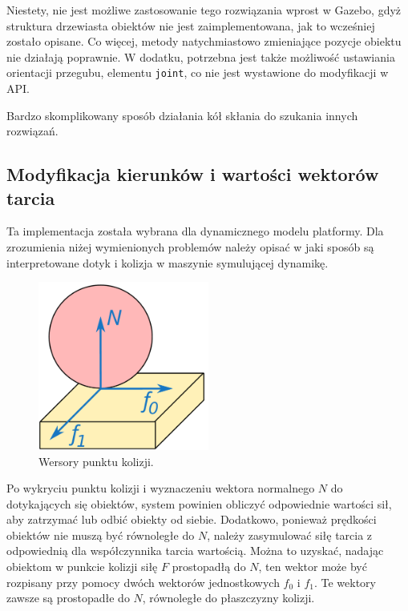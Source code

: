 		Niestety, nie jest możliwe zastosowanie tego rozwiązania wprost w Gazebo, gdyż struktura drzewiasta obiektów nie jest zaimplementowana, jak to wcześniej zostało opisane.
		Co więcej, metody natychmiastowo zmieniające pozycje obiektu nie działają poprawnie.
		W dodatku, potrzebna jest także możliwość ustawiania orientacji przegubu, elementu \texttt{joint}, co nie jest wystawione do modyfikacji w API.

		Bardzo skomplikowany sposób działania kół skłania do szukania innych rozwiązań.

	\subsection{Modyfikacja kierunków i wartości wektorów tarcia}
		\label{sec:friction}
		Ta implementacja została wybrana dla dynamicznego modelu platformy.
		Dla zrozumienia niżej wymienionych problemów należy opisać w jaki sposób są interpretowane dotyk i kolizja w maszynie symulującej dynamikę.

		\begin{figure}[h]
		\centering
		\includegraphics[width=0.5\textwidth]{graphics/friction.pdf}
		\caption{Wersory punktu kolizji.}
		\label{fig:ode_collision}
		\end{figure} 

		Po wykryciu punktu kolizji i wyznaczeniu wektora normalnego $N$ do dotykających się obiektów, system powinien obliczyć odpowiednie wartości sił, 
		aby zatrzymać lub odbić obiekty od siebie.
		Dodatkowo, ponieważ prędkości obiektów nie muszą być równoległe do $N$, należy zasymulować siłę tarcia z odpowiednią dla współczynnika tarcia wartością.
		Można to uzyskać, nadając obiektom w punkcie kolizji siłę $F$ prostopadłą do $N$, 
		ten wektor może być rozpisany przy pomocy dwóch wektorów jednostkowych $f_0$ i $f_1$. 
		Te wektory zawsze są prostopadłe do $N$, równoległe do płaszczyzny kolizji.

